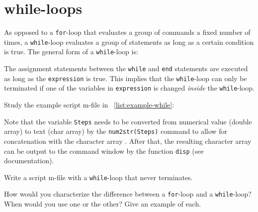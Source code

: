 \section{while-loops}
\label{sec:while-loops}

As opposed to a {\tt for}-loop that evaluates a group of commands a fixed number of times, a {\tt while}-loop evaluates a group of statements as long as a certain condition is true. The general form of a {\tt while}-loop is:


\noindent The assignment statements between the {\tt while} and {\tt end} statements are executed as long as the {\tt expression} is true. This implies that the {\tt while}-loop can only be terminated if one of the variables in {\tt expression} is changed \textit{inside} the {\tt while}-loop.

\begin{action}
Study the example script m-file in \lstlistingname~\ref{list:example-while}:
\end{action}


\noindent Note that the variable {\tt Steps} needs to be converted from numerical value (double array) to text (char array) by the {\tt num2str(Steps)} command to allow for concatenation with the character array {\tt {}}. After that, the resulting character array can be output to the command window by the function {\tt disp} (see \MATLAB{} documentation). 



\begin{action}
Write a script m-file with a {\tt while}-loop that never terminates.
\end{action}

\begin{action}
How would you characterize the difference between a {\tt for}-loop and a {\tt while}-loop? When would you use one or the other? Give an example of each.
\end{action}





